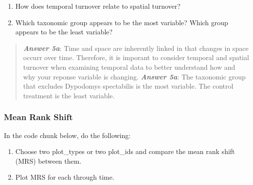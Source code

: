 \documentclass[]{article}
\providecommand{\tightlist}{%
  \setlength{\itemsep}{0pt}\setlength{\parskip}{0pt}}
\begin{document}
\begin{enumerate}
\def\labelenumi{\alph{enumi}.}
\tightlist
\item
  How does temporal turnover relate to spatial turnover?\\
\item
  Which taxonomic group appears to be the most variable? Which group
  appears to be the least variable?
\end{enumerate}

\begin{quote}
\textbf{\emph{Answer 5a}}: Time and space are inherently linked in that
changes in space occurr over time. Therefore, it is imporant to consider
temporal and spatial turnover when examining temporal data to better
understand how and why your reponse variable is changing.
\textbf{\emph{Answer 5a}}: The taxonomic group that excludes Dypodomys
spectabilis is the most variable. The control treatment is the least
variable.
\end{quote}

\subsubsection{Mean Rank Shift}\label{mean-rank-shift}

In the code chunk below, do the following:

\begin{enumerate}
\def\labelenumi{\arabic{enumi}.}
\tightlist
\item
  Choose two plot\_types or two plot\_ids and compare the mean rank
  shift (MRS) between them.
\item
  Plot MRS for each through time.
\end{enumerate}
\end{document}
